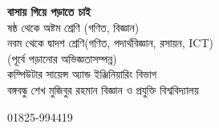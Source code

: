 \documentclass[6pt, serif]{beamer}
\begin{document}
\frame
{
\begin{center}
	{\Huge \textbf{বাসায় গিয়ে পড়াতে চাই}}\\
	\vspace{12pt}
	ষষ্ঠ থেকে অষ্টম শ্রেণি \hspace{4 pt}(গণিত, বিজ্ঞান)\\
	নবম থেকে দ্বাদশ শ্রেণি\hspace{4 pt}(গণিত, পদার্থবিজ্ঞান, রসায়ন, ICT)\\
	\footnotesize{(পূর্বে পড়ানোর অভিজ্ঞতাসম্পন্ন)}\\
	\vspace{8 pt}
	কম্পিউটার সায়েন্স অ্যান্ড ইঞ্জিনিয়ারিং বিভাগ \\ বঙ্গবন্ধু শেখ মুজিবুর রহমান বিজ্ঞান ও প্রযুক্তি বিশ্ববিদ্যালয় \\
	\vspace{5 pt}
	\begin{tcolorbox}[width=110pt]
		\faPhoneSquare \hspace{2 pt} 01825-994419
	\end{tcolorbox}
\end{center}
}
\end{document}

